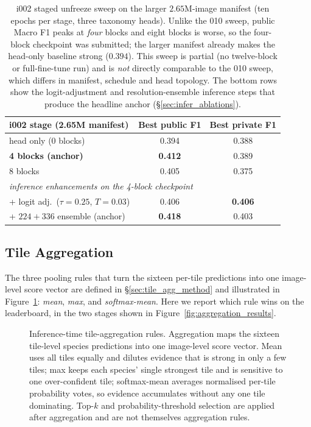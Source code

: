 \begin{table}[ht]
  \centering
  \small
  \begin{tabular}{lcc}
    \toprule
    i002 stage (2.65M manifest) & Best public F1 & Best private F1 \\
    \midrule
    head only (0 blocks)         & 0.394 & 0.388 \\
    \textbf{4 blocks (anchor)} & \textbf{0.412} & 0.389 \\
    8 blocks                     & 0.405 & 0.375 \\
    \midrule
    \multicolumn{3}{l}{\emph{inference enhancements on the 4-block checkpoint}}\\
    \quad + logit adj.\ ($\tau{=}0.25$, $T{=}0.03$) & 0.406 & \textbf{0.406} \\
    \quad + $224{+}336$ ensemble (anchor)            & \textbf{0.418} & 0.403 \\
    \bottomrule
  \end{tabular}
  \caption{i002 staged unfreeze sweep on the larger $2.65$M-image manifest (ten epochs per stage, three taxonomy heads). Unlike the 010 sweep, public Macro F1 peaks at \emph{four} blocks and eight blocks is worse, so the four-block checkpoint was submitted; the larger manifest already makes the head-only baseline strong ($0.394$). This sweep is partial (no twelve-block or full-fine-tune run) and is \emph{not} directly comparable to the 010 sweep, which differs in manifest, schedule and head topology. The bottom rows show the logit-adjustment and resolution-ensemble inference steps that produce the headline anchor (\S\ref{sec:infer_ablations}).}
  \label{tab:blocks_i002}
\end{table}

\subsection{Tile Aggregation}
\label{sec:tile_aggregation}

The three pooling rules that turn the sixteen per-tile predictions into one image-level score
vector are defined in \S\ref{sec:tile_agg_method} and illustrated in
Figure~\ref{fig:aggregation_definitions}: \emph{mean}, \emph{max}, and \emph{softmax-mean}.
Here we report which rule wins on the leaderboard, in the two stages shown in
Figure~\ref{fig:aggregation_results}.

\begin{figure}[t]
  \centering
  
  \caption{Inference-time tile-aggregation rules. Aggregation maps the sixteen tile-level species predictions into one image-level score vector. Mean uses all tiles equally and dilutes evidence that is strong in only a few tiles; max keeps each species' single strongest tile and is sensitive to one over-confident tile; softmax-mean averages normalised per-tile probability votes, so evidence accumulates without any one tile dominating. Top-$k$ and probability-threshold selection are applied after aggregation and are not themselves aggregation rules.}
  \label{fig:aggregation_definitions}
\end{figure}


